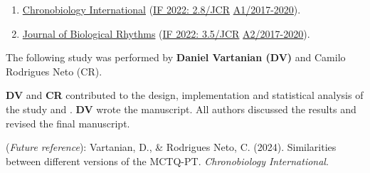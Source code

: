 \documentclass[
  12pt,
  a4paper,
  oneside]{tesesusp}
\providecommand{\tightlist}{%
  \setlength{\itemsep}{0pt}\setlength{\parskip}{0pt}}\usepackage{longtable,booktabs,array}
\begin{document}
\begin{tcolorbox}[enhanced jigsaw, breakable, colback=white, colbacktitle=quarto-callout-note-color!10!white, leftrule=.75mm, left=2mm, toprule=.15mm, opacityback=0, rightrule=.15mm, title=\textcolor{quarto-callout-note-color}{\faInfo}\hspace{0.5em}{Target}, opacitybacktitle=0.6, bottomtitle=1mm, titlerule=0mm, toptitle=1mm, coltitle=black, colframe=quarto-callout-note-color-frame, bottomrule=.15mm, arc=.35mm]

\begin{enumerate}
\def\labelenumi{\arabic{enumi}.}
\tightlist
\item
  \href{https://www.tandfonline.com/action/authorSubmission?show=instructions\&journalCode=icbi20}{Chronobiology
  International} (\href{https://jcr.clarivate.com/jcr/}{IF 2022:
  2.8/JCR} \textbar{}
  \href{https://sucupira.capes.gov.br/sucupira/public/consultas/coleta/veiculoPublicacaoQualis/listaConsultaGeralPeriodicos.jsf}{A1/2017-2020}).
\item
  \href{https://journals.sagepub.com/author-instructions/JBR}{Journal of
  Biological Rhythms} (\href{https://jcr.clarivate.com/jcr/}{IF 2022:
  3.5/JCR} \textbar{}
  \href{https://sucupira.capes.gov.br/sucupira/public/consultas/coleta/veiculoPublicacaoQualis/listaConsultaGeralPeriodicos.jsf}{A2/2017-2020}).
\end{enumerate}

\end{tcolorbox}

\begin{tcolorbox}[enhanced jigsaw, breakable, colback=white, colbacktitle=quarto-callout-note-color!10!white, leftrule=.75mm, left=2mm, toprule=.15mm, opacityback=0, rightrule=.15mm, title=\textcolor{quarto-callout-note-color}{\faInfo}\hspace{0.5em}{Note}, opacitybacktitle=0.6, bottomtitle=1mm, titlerule=0mm, toptitle=1mm, coltitle=black, colframe=quarto-callout-note-color-frame, bottomrule=.15mm, arc=.35mm]

The following study was performed by \textbf{Daniel Vartanian (DV)} and
Camilo Rodrigues Neto (CR).

\textbf{DV} and \textbf{CR} contributed to the design, implementation
and statistical analysis of the study and . \textbf{DV} wrote the
manuscript. All authors discussed the results and revised the final
manuscript.

(\emph{Future reference}): Vartanian, D., \& Rodrigues Neto, C. (2024).
Similarities between different versions of the MCTQ-PT.
\emph{Chronobiology International}.

\end{tcolorbox}
\end{document}
